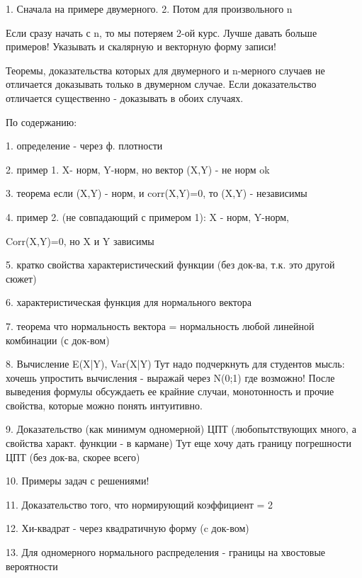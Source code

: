 1. Сначала на примере двумерного.
2. Потом для произвольного n

Если сразу начать с n, то мы потеряем 2-ой курс.
Лучше давать больше примеров!
Указывать и скалярную и векторную форму записи!

Теоремы, доказательства которых для двумерного и n-мерного случаев не
отличается доказывать только в двумерном случае.
Если доказательство отличается существенно - доказывать в обоих случаях.

По содержанию:

1. определение - через ф. плотности

2. пример 1. X- норм, Y-норм, но вектор (X,Y) - не норм ok

3. теорема если (X,Y) - норм, и corr(X,Y)=0, то (X,Y) - независимы

4. пример 2. (не совпадающий с примером 1): X - норм, Y-норм,

Corr(X,Y)=0, но X и Y зависимы

5. кратко свойства характеристический функции (без док-ва, т.к. это
другой сюжет)

6. характеристическая функция для нормального вектора

7. теорема что нормальность вектора = нормальность любой линейной комбинации
(с док-вом)

8. Вычисление E(X|Y), Var(X|Y)
Тут надо подчеркнуть для студентов мысль: хочешь упростить вычисления
- выражай через N(0;1) где возможно!
После выведения формулы обсуждаеть ее крайние случаи, монотонность и
прочие свойства, которые можно понять интуитивно.

9. Доказательство (как минимум одномерной) ЦПТ (любопытствующих много,
а свойства характ. функции - в кармане)
Тут еще хочу дать границу погрешности ЦПТ (без док-ва, скорее всего)

10. Примеры задач с решениями!

11. Доказательство того, что нормирующий коэффициент = 2\pi

12. Хи-квадрат - через квадратичную форму (c док-вом)

13. Для одномерного нормального распределения - границы на хвостовые вероятности
